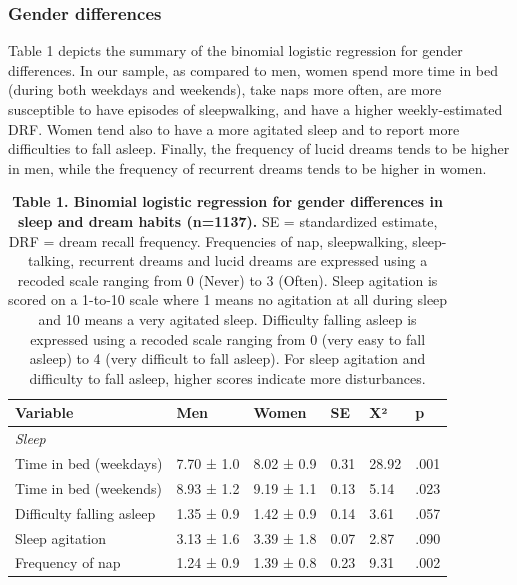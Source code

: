 \subsubsection*{Gender differences}
Table 1 depicts the summary of the binomial logistic regression for gender differences. In our sample, as compared to men, women spend more time in bed (during both weekdays and weekends), take naps more often, are more susceptible to have episodes of sleepwalking, and have a higher weekly-estimated DRF. Women tend also to have a more agitated sleep and to report more difficulties to fall asleep. Finally, the frequency of lucid dreams tends to be higher in men, while the frequency of recurrent dreams tends to be higher in women.

\begin{table}[!htbp]
    \caption*{\textbf{Table 1. Binomial logistic regression for gender differences in sleep and dream habits (n=1137).} SE = standardized estimate, DRF = dream recall frequency. Frequencies of nap, sleepwalking, sleep-talking, recurrent dreams and lucid dreams are expressed using a recoded scale ranging from 0 (Never) to 3 (Often). Sleep agitation is scored on a 1-to-10 scale where 1 means no agitation at all during sleep and 10 means a very agitated sleep. Difficulty falling asleep is expressed using a recoded scale ranging from 0 (very easy to fall asleep) to 4 (very difficult to fall asleep). For sleep agitation and difficulty to fall asleep, higher scores indicate more disturbances.}
    \begin{tabularx}{\textwidth}{lllXXX}
    \toprule
    Variable                       & Men                       & Women         & SE    & X²    & p        \\ \midrule
    \emph{Sleep}                   &                           &               &       &       &          \\
    Time in bed (weekdays)         & 7.70 ± 1.0                & 8.02 ± 0.9    & 0.31  & 28.92 & .001     \\
    Time in bed (weekends)         & 8.93 ± 1.2                & 9.19 ± 1.1    & 0.13  & 5.14  & .023     \\
    Difficulty falling asleep      & 1.35 ± 0.9                & 1.42 ± 0.9    & 0.14  & 3.61  & .057     \\
    Sleep agitation                & 3.13 ± 1.6                & 3.39 ± 1.8    & 0.07  & 2.87  & .090     \\
    Frequency of nap               & 1.24 ± 0.9                & 1.39 ± 0.8    & 0.23  & 9.31  & .002     \\

\end{tabularx}
\end{table}
